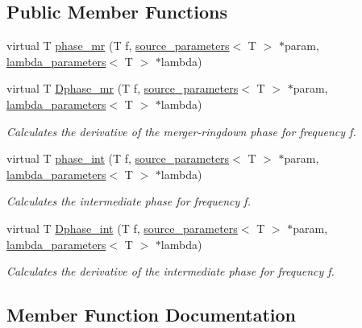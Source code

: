 \subsection*{Public Member Functions}
\begin{DoxyCompactItemize}
\item 
virtual T \hyperlink{classppE__IMRPhenomPv2__IMR_a498e1d8b7ea85028b295feb9487ca066}{phase\+\_\+mr} (T f, \hyperlink{structsource__parameters}{source\+\_\+parameters}$<$ T $>$ $\ast$param, \hyperlink{structlambda__parameters}{lambda\+\_\+parameters}$<$ T $>$ $\ast$lambda)
\item 
virtual T \hyperlink{classppE__IMRPhenomPv2__IMR_acaccc873b9eab76c4640c478e69a7e20}{Dphase\+\_\+mr} (T f, \hyperlink{structsource__parameters}{source\+\_\+parameters}$<$ T $>$ $\ast$param, \hyperlink{structlambda__parameters}{lambda\+\_\+parameters}$<$ T $>$ $\ast$lambda)
\begin{DoxyCompactList}\small\item\em Calculates the derivative of the merger-\/ringdown phase for frequency f. \end{DoxyCompactList}\item 
virtual T \hyperlink{classppE__IMRPhenomPv2__IMR_a713b095dacec9472b5361c1caf884347}{phase\+\_\+int} (T f, \hyperlink{structsource__parameters}{source\+\_\+parameters}$<$ T $>$ $\ast$param, \hyperlink{structlambda__parameters}{lambda\+\_\+parameters}$<$ T $>$ $\ast$lambda)
\begin{DoxyCompactList}\small\item\em Calculates the intermediate phase for frequency f. \end{DoxyCompactList}\item 
virtual T \hyperlink{classppE__IMRPhenomPv2__IMR_af192ae33e9293ed487b583d21f6c5bcd}{Dphase\+\_\+int} (T f, \hyperlink{structsource__parameters}{source\+\_\+parameters}$<$ T $>$ $\ast$param, \hyperlink{structlambda__parameters}{lambda\+\_\+parameters}$<$ T $>$ $\ast$lambda)
\begin{DoxyCompactList}\small\item\em Calculates the derivative of the intermediate phase for frequency f. \end{DoxyCompactList}\end{DoxyCompactItemize}


\subsection{Member Function Documentation}
\mbox{\label{classppE__IMRPhenomPv2__IMR_af192ae33e9293ed487b583d21f6c5bcd}} 
